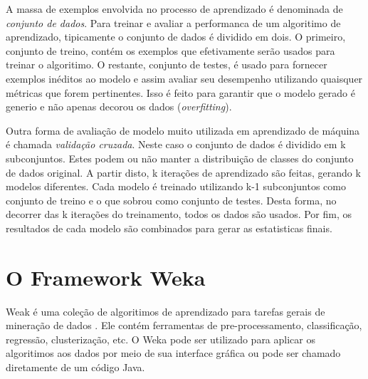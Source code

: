 
A massa de exemplos envolvida no processo de aprendizado é denominada de \textit{conjunto de dados}.
Para treinar e avaliar a performanca de um algoritimo de aprendizado, tipicamente o conjunto de dados é dividido em dois.
O primeiro, conjunto de treino, contém os exemplos que efetivamente serão usados para treinar o algoritimo.
O restante, conjunto de testes, é usado para fornecer exemplos inéditos ao modelo e assim avaliar seu desempenho utilizando quaisquer métricas que forem pertinentes.
Isso é feito para garantir que o modelo gerado é generio e não apenas decorou os dados (\textit{overfitting}).

Outra forma de avaliação de modelo muito utilizada em aprendizado de máquina é chamada \textit{validação cruzada}.
Neste caso o conjunto de dados é dividido em k subconjuntos.
Estes podem ou não manter a distribuição de classes do conjunto de dados original.
A partir disto, k iterações de aprendizado são feitas, gerando k modelos diferentes.
Cada modelo é treinado utilizando k-1 subconjuntos como conjunto de treino e o que sobrou como conjunto de testes.
Desta forma, no decorrer das k iterações do treinamento, todos os dados são usados.
Por fim, os resultados de cada modelo são combinados para gerar as estatisticas finais.

\section{O Framework Weka}

Weak é uma coleção de algoritimos de aprendizado para tarefas gerais de mineração de dados \cite{Hall}.
Ele contém ferramentas de pre-processamento, classificação, regressão, clusterização, etc.
O Weka pode ser utilizado para aplicar os algoritimos aos dados por meio de sua interface gráfica ou pode ser chamado diretamente de um código Java.
